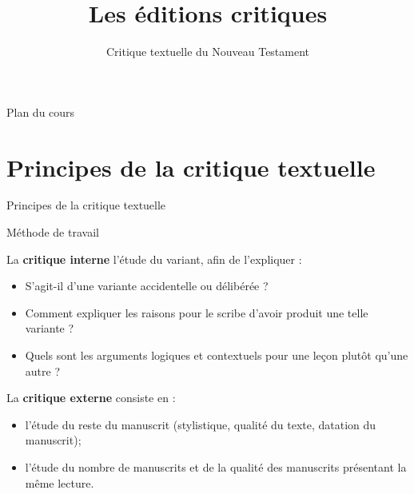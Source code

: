 \documentclass[11pt]{beamer}
\begin{document}
\title{Les éditions critiques}
\subtitle{Critique textuelle du Nouveau Testament}

\begin{frame}{}
    \titlepage
\end{frame}

\begin{frame}{Plan du cours}
\tableofcontents
\end{frame}



\section{Principes de la critique textuelle}

\begin{frame}{Principes de la critique textuelle}
    \begin{alertblock}{}
        
    \end{alertblock}
\end{frame}

\begin{frame}{Méthode de travail}
    \begin{alertblock}{}
        La \textbf{critique interne} l'étude du variant, afin de l'expliquer :
        \begin{itemize}
        \item S'agit-il d'une variante accidentelle ou délibérée ? 
        \item Comment expliquer les raisons pour le scribe d'avoir produit une telle variante ?
        \item Quels sont les arguments logiques et contextuels pour une leçon plutôt qu'une autre ? 
        \end{itemize}
    \end{alertblock}

    \begin{alertblock}{}
        La \textbf{critique externe} consiste en :
        \begin{itemize}
            \item l'étude du reste du manuscrit (stylistique, qualité du texte, datation du manuscrit);
            \item l'étude du nombre de manuscrits et de la qualité des manuscrits présentant la même lecture.
        \end{itemize}
    \end{alertblock}
\end{frame}
\end{document}
